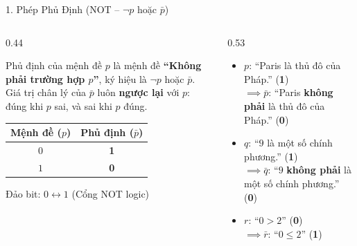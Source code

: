 \documentclass[aspectratio=169, 10pt]{beamer}
\begin{document}
\begin{frame}{1. Phép Phủ Định (NOT -- $\neg p$ hoặc $\bar{p}$)}
  \begin{columns}[t, onlytextwidth]
    \begin{column}{0.44\textwidth}
      \begin{cozyDef}
        \small
        Phủ định của mệnh đề $p$ là mệnh đề \textbf{``Không phải trường hợp $p$''}, ký hiệu là $\neg p$ hoặc $\bar{p}$.\\
        \vspace{0.05cm}
        Giá trị chân lý của $\bar{p}$ luôn \textbf{ngược lại} với $p$: đúng khi $p$ sai, và sai khi $p$ đúng.
        \vspace{0.2cm}
        \begin{center}
          \renewcommand{\arraystretch}{1.15}
          \begin{tabular}{cc}
            \toprule
            \textbf{Mệnh đề ($p$)} & \textbf{Phủ định ($\bar{p}$)} \\
            \midrule
            $0$ & \textbf{\textcolor{cozyTrue}{1}} \\
            $1$ & \textbf{\textcolor{cozyFalse}{0}} \\
            \bottomrule
          \end{tabular}
        \end{center}
        \vspace{0.1cm}
        \par\footnotesize\centering\color{cozyMuted}
        Đảo bit: $0 \leftrightarrow 1$ (Cổng NOT logic)
      \end{cozyDef}
    \end{column}
    \begin{column}{0.53\textwidth}
      \begin{cozyInsight}
        \small
        \begin{itemize}
          \setlength{\itemsep}{4pt}
          \item $p$: ``Paris là thủ đô của Pháp.'' (\textbf{\textcolor{cozyTrue}{1}})\\
          $\implies \bar{p}$: ``Paris \textbf{không phải} là thủ đô của Pháp.'' (\textbf{\textcolor{cozyFalse}{0}})
          \item $q$: ``$9$ là một số chính phương.'' (\textbf{\textcolor{cozyTrue}{1}})\\
          $\implies \bar{q}$: ``$9$ \textbf{không phải} là một số chính phương.'' (\textbf{\textcolor{cozyFalse}{0}})
          \item $r$: ``$0 > 2$'' (\textbf{\textcolor{cozyFalse}{0}})\\
          $\implies \bar{r}$: ``$0 \le 2$'' (\textbf{\textcolor{cozyTrue}{1}})
        \end{itemize}
      \end{cozyInsight}
    \end{column}
  \end{columns}
\end{frame}
\end{document}
